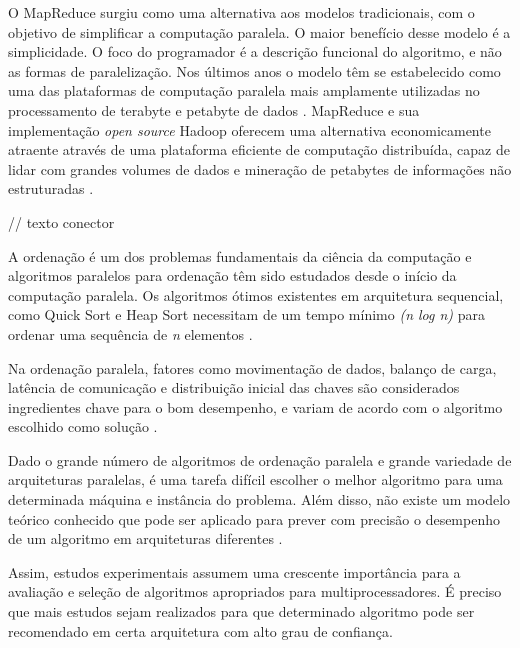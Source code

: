 O MapReduce surgiu como uma alternativa aos modelos tradicionais, com o objetivo de simplificar a computação paralela. O maior benefício desse modelo é a simplicidade. O foco do programador é a descrição funcional do algoritmo, e não as formas de paralelização. Nos últimos anos o modelo têm se estabelecido como uma das plataformas de computação paralela mais amplamente utilizadas no processamento de terabyte e petabyte de dados \cite{Ranger:2007}.
MapReduce e sua implementação \textit{open source} Hadoop oferecem  uma alternativa economicamente atraente através de uma plataforma eficiente de computação distribuída, capaz de lidar com grandes volumes de dados e mineração de petabytes de informações não estruturadas \cite{Cherkasova:2011}.

// texto conector


A ordenação é um dos problemas fundamentais da ciência da computação e algoritmos paralelos para ordenação têm sido estudados desde o início da computação paralela.
Os algoritmos ótimos existentes em arquitetura sequencial, como Quick Sort e Heap Sort necessitam de um tempo mínimo \textit{(n log n)} para ordenar uma sequência de \textit{n} elementos \cite{Aho:1974}.


Na ordenação paralela, fatores como movimentação de dados, balanço de carga, latência de comunicação e distribuição inicial das chaves são considerados ingredientes chave para o bom desempenho, e variam de acordo com o algoritmo escolhido como solução \cite{Kale:2010}. 

Dado o grande número de algoritmos de ordenação paralela e grande variedade de arquiteturas paralelas, é uma tarefa difícil escolher o melhor algoritmo para uma determinada máquina e instância do problema. Além disso, não existe um modelo teórico conhecido que pode ser aplicado para prever com precisão o desempenho de um algoritmo em arquiteturas diferentes \cite{Amato:1996}.

Assim, estudos experimentais assumem uma crescente importância para a avaliação e seleção de algoritmos apropriados para multiprocessadores. É preciso que mais estudos sejam realizados para que determinado algoritmo pode ser recomendado em certa arquitetura com alto grau de confiança.

